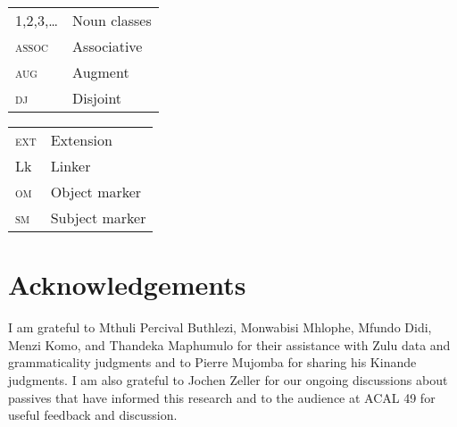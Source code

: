 \documentclass[output=paper,colorlinks,citecolor=brown]{langscibook}
\begin{document}
\begin{minipage}[t][][b]{.45\textwidth}
	\begin{tabularx}{\textwidth}{lQ}
		1,2,3,\ldots & Noun classes \\
		\textsc{assoc} & Associative \\
		\textsc{aug} & Augment \\
		\textsc{dj} & Disjoint
	\end{tabularx}
\end{minipage}%
\begin{minipage}[t][][b]{.45\textwidth}
	\begin{tabularx}{\textwidth}{lQ}
		\textsc{ext} & Extension \\
		Lk & Linker \\
		\textsc{om} & Object marker \\
		\textsc{sm} & Subject marker
	\end{tabularx}
\end{minipage}

\section*{Acknowledgements}

I am grateful to Mthuli Percival Buthlezi, Monwabisi Mhlophe, Mfundo Didi, Menzi Komo, and Thandeka Maphumulo  for their assistance with Zulu data and grammaticality judgments and to Pierre Mujomba for sharing his Kinande judgments. I am also grateful to Jochen Zeller for our ongoing discussions about passives that have informed this research and to the audience at ACAL 49 for useful feedback and discussion.

{\sloppy\printbibliography[heading=subbibliography,notkeyword=this]}
\end{document}
